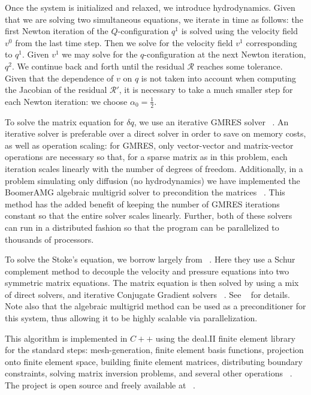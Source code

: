 \documentclass[reqno]{article}
\begin{document}
  Once the system is initialized and relaxed, we introduce hydrodynamics.
  Given that we are solving two simultaneous equations, we iterate in time as
  follows: the first Newton
  iteration of the $Q$-configuration $q^1$ is solved using the velocity field
  $v^0$ from the last time step.
  Then we solve for the velocity field $v^1$ corresponding to $q^1$.
  Given $v^1$ we may solve for the $q$-configuration at the next Newton
  iteration, $q^2$.
  We continue back and forth until the residual $\mathcal{R}$ reaches some
  tolerance.
  Given that the dependence of $v$ on $q$ is not taken into account when
  computing the Jacobian of the residual $\mathcal{R}'$, it is necessary to take
  a much smaller step for each Newton iteration: we choose $\alpha_0 =
  \tfrac12$.

  To solve the matrix equation for $\delta q$, we use an iterative GMRES solver ~\cite{demmel_applied_1997}.
  An iterative solver is preferable over a direct solver in order to save on
  memory costs, as well as operation scaling: for GMRES, only vector-vector and
  matrix-vector operations are necessary so that, for a sparse matrix as in this
  problem, each iteration scales linearly with the number of degrees of freedom.
  Additionally, in a problem simulating only diffusion (no hydrodynamics) we
  have implemented the BoomerAMG algebraic multigrid solver to precondition the
  matrices ~\cite{henson_boomeramg_2002}.
  This method has the added benefit of keeping the number of GMRES iterations
  constant so that the entire solver scales linearly.
  Further, both of these solvers can run in a distributed fashion so that the
  program can be parallelized to thousands of processors.

  To solve the Stoke's equation, we borrow largely from ~\cite{step_22}.
  Here they use a Schur complement method to decouple the velocity and pressure
  equations into two symmetric matrix equations.
  The matrix equation is then solved by using a mix of direct solvers, and
  iterative Conjugate Gradient solvers ~\cite{demmel_applied_1997}.
  See ~\cite{step_22} for details.
  Note also that the algebraic multigrid method can be used as a preconditioner
  for this system, thus allowing it to be highly scalable via parallelization.

  This algorithm is implemented in $C++$ using the deal.II finite element
  library for the standard steps: mesh-generation, finite element basis
  functions, projection onto finite element space, building finite element
  matrices, distributing boundary constraints, solving matrix inversion
  problems, and several other operations ~\cite{dealII93, dealii2019design}.
  The project is open source and freely available at
  ~\cite{Myers_maier-saupe-lc-hydrodynamics_2022}.
\end{document}
